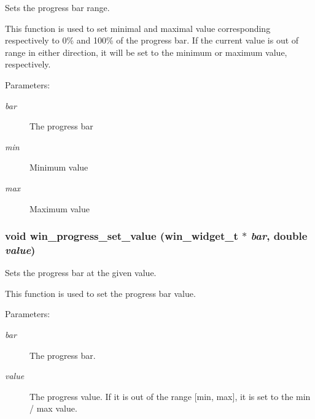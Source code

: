 Sets the progress bar range. 

This function is used to set minimal and maximal value corresponding respectively to 0\% and 100\% of the progress bar. If the current value is out of range in either direction, it will be set to the minimum or maximum value, respectively.

\begin{Desc}
\item[Parameters:]
\begin{description}
\item[{\em bar}]The progress bar \item[{\em min}]Minimum value \item[{\em max}]Maximum value \end{description}
\end{Desc}
\subsubsection{\setlength{\rightskip}{0pt plus 5cm}void win\_\-progress\_\-set\_\-value ({\bf win\_\-widget\_\-t} $\ast$ {\em bar}, double {\em value})}\label{winprogress_8h_a5}


Sets the progress bar at the given value. 

This function is used to set the progress bar value.

\begin{Desc}
\item[Parameters:]
\begin{description}
\item[{\em bar}]The progress bar. \item[{\em value}]The progress value. If it is out of the range [min, max], it is set to the min / max value. \end{description}
\end{Desc}
